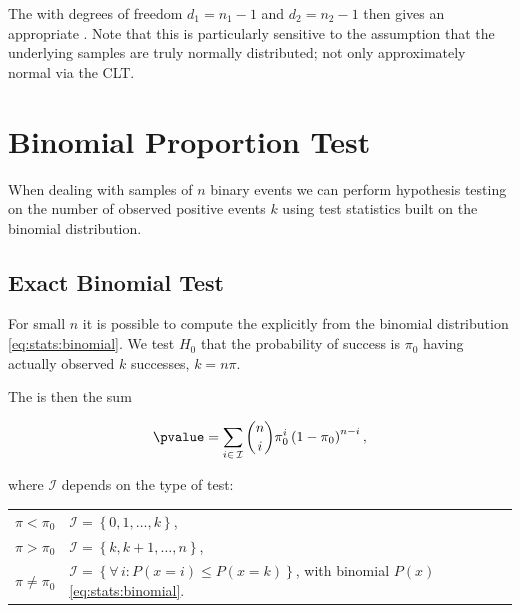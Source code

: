 The \Fdist with degrees of freedom $d_{1} = n_{1}-1$ and $d_{2} = n_{2}-1$
then gives an appropriate \pvalue.
Note that this \Ftest is particularly sensitive to the assumption that
the underlying samples are truly normally distributed;
not only approximately normal via the CLT.

\section{Binomial Proportion Test}
\label{hypo:binomial_test}

When dealing with samples of $n$ binary events we can perform hypothesis testing
on the number of observed positive events $k$
using test statistics built on the binomial distribution.

\subsection{Exact Binomial Test}
\label{hypo:binomial_test:exact}

For small $n$ it is possible to compute the \pvalue
explicitly from the binomial distribution \cref{eq:stats:binomial}.
We test $H_{0}$ that the probability of success is $\pi_{0}$
having actually observed $k$ successes, $k = n \pi$.

The \pvalue is then the sum

\begin{equation}\label{eq:hypo:binomial_test:exact}
\pvalue = \sum_{i \in \, \mathcal{I}} {n \choose i}\pi_{0}^{i} \left(1-\pi_{0}\right)^{n-i},
\end{equation}

\noindent where $\mathcal{I}$ depends on the type of test:

\begin{table}[H]
\centering
\begin{tabular}{l|l}
$\pi < \pi_{0}$ & $\mathcal{I} = \left\{0, 1, \ldots, k\right\}$, \\
$\pi > \pi_{0}$ & $\mathcal{I} = \left\{k, k+1, \ldots, n\right\}$, \\
$\pi \neq \pi_{0}$ & $\mathcal{I} = \left\{\forall \, i: P\left(x=i\right) \leq P\left(x = k\right)\right\}$, with binomial $P\left(x\right)$ \cref{eq:stats:binomial}.
\end{tabular}
\end{table}

